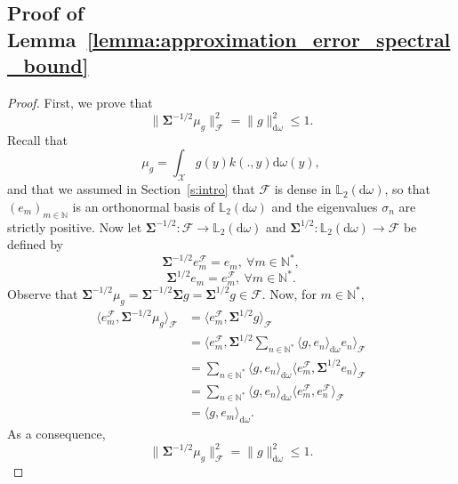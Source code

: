 \documentclass[twoside,11pt]{book}
\numberwithin{theorem}{chapter}
\numberwithin{definition}{chapter}
\numberwithin{proposition}{chapter}
\numberwithin{corollary}{chapter}
\numberwithin{example}{chapter}
\numberwithin{lemma}{chapter}
\numberwithin{assumption}{chapter}
\numberwithin{equation}{chapter}
\numberwithin{figure}{chapter}
\newcommand{\ab}[1]{\textcolor{red}{#1}}
\begin{document}
\subsection{Proof of Lemma~\ref{lemma:approximation_error_spectral_bound}}
\label{s:proofOfSeparationLemma}
\begin{proof}
First, we prove that
\begin{equation}
  \|\bm{\Sigma}^{-1/2}\mu_{g}\|_{\mathcal{F}}^{2} = \|g\|_{\mathrm{d}\omega}^{2} \leq 1.
\end{equation} 
 Recall that
\begin{equation}
\mu_{g} = \int_{\mathcal{X}} g(y)k(.,y) \mathrm{d}\omega(y),
\end{equation}
and that we assumed in Section~\ref{s:intro} that $\mathcal{F}$ is dense in $\mathbb{L}_{2}(\mathrm{d}\omega)$, so that $(e_{m})_{m \in \mathbb{N}}$ is an orthonormal basis of $\mathbb{L}_{2}(\mathrm{d}\omega)$ and the eigenvalues $\sigma_{n}$ are strictly positive. Now let $\bm{\Sigma}^{-1/2} : \mathcal{F} \rightarrow \mathbb{L}_{2}(\mathrm{d}\omega)$ and $\bm{\Sigma}^{1/2} : \mathbb{L}_{2}(\mathrm{d}\omega) \rightarrow \mathcal{F}$ be defined by
\begin{equation}
\bm{\Sigma}^{-1/2} e_{m}^{\mathcal{F}} = e_{m}, \: \forall m\in \mathbb{N}^*,
\end{equation}
\begin{equation}
\bm{\Sigma}^{1/2} e_{m} =  e_{m}^{\mathcal{F}}, \: \forall m\in \mathbb{N}^*.
\end{equation}
Observe that $\bm{\Sigma}^{-1/2} \mu_{g} = \bm{\Sigma}^{-1/2} \bm{\Sigma} g = \bm{\Sigma}^{1/2} g \in \mathcal{F}$. Now, for $m \in \mathbb{N}^{*}$,
\begin{align}
\langle e_{m}^{\mathcal{F}}, \bm{\Sigma}^{-1/2}\mu_{g} \rangle_{\mathcal{F}} & =\langle e_{m}^{\mathcal{F}}, \bm{\Sigma}^{1/2}g \rangle_{\mathcal{F}} \\
& = \langle e_{m}^{\mathcal{F}}, \bm{\Sigma}^{1/2} \sum\limits_{n \in \mathbb{N}^{*}} \langle g, e_{n} \rangle_{\mathrm{d}\omega} e_{n} \rangle_{\mathcal{F}}\\
& = \sum\limits_{n \in \mathbb{N}^{*}} \langle g, e_{n} \rangle_{\mathrm{d}\omega} \langle e_{m}^{\mathcal{F}}, \bm{\Sigma}^{1/2} e_{n} \rangle_{\mathcal{F}} \\
& = \sum\limits_{n \in \mathbb{N}^{*}} \langle g, e_{n} \rangle_{\mathrm{d}\omega} \langle e_{m}^{\mathcal{F}},  e_{n}^{\mathcal{F}} \rangle_{\mathcal{F}} \\
& = \langle g,e_{m} \rangle_{\mathrm{d}\omega} \nonumber.
\end{align}
As a consequence,
\begin{equation}\label{eq:bound_on_norm_mean_element}
  \|\bm{\Sigma}^{-1/2}\mu_{g}\|_{\mathcal{F}}^{2} = \|g\|_{\mathrm{d}\omega}^{2} \leq 1.
\end{equation} 





\end{proof}
\end{document}

